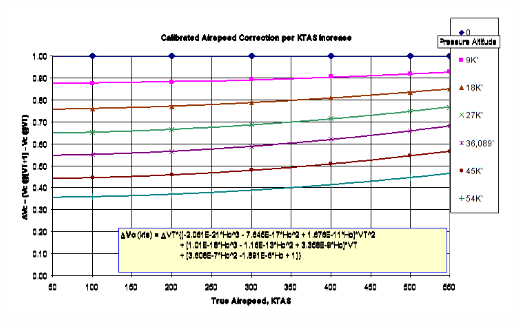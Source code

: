 \documentclass[
]{book}
\begin{document}
\includegraphics[width=5.33889in,height=9in]{media/04/image57.png}
\end{document}
